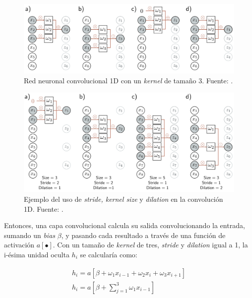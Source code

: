 \begin{figure}[H]
	\centering
	\includegraphics[width=\textwidth]{../img/theory/cnn}
	\caption{Red neuronal convolucional 1D con un \textit{kernel} de tamaño 3. Fuente: \cite{prince2023understanding}.}
	\label{fig:cnn_1d}
\end{figure}



\begin{figure}[H]
	\centering
	\includegraphics[width=\textwidth]{../img/theory/conv1d}
	\caption{Ejemplo del uso de \textit{stride, kernel size} y \textit{dilation} en la convolución 1D. Fuente: \cite{prince2023understanding}.}
	\label{fig:conv1d}
\end{figure}

Entonces, una capa convolucional calcula su salida convolucionando la entrada, sumando un \textit{bias} $\beta$, y pasando cada resultado a través de una función de activación $a[\bullet]$. Con un tamaño de \textit{kernel} de tres, \textit{stride} y \textit{dilation} igual a 1, la i-ésima unidad oculta $h_i$ se calcularía como:

\begin{equation}
	\begin{gathered}
	h_i = a [ \beta + \omega_1x_{i-1} + \omega_2x_{i} + \omega_3x_{i+1}] \\
	h_i = a \left[ \beta + \sum_{j=1}^{3} \omega_1x_{i-1} \right]
	\end{gathered}
\end{equation}


